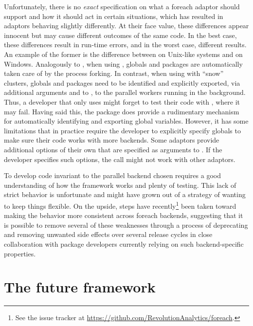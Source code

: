 Unfortunately, there is no \emph{exact} specification on what a
foreach adaptor should support and how it should act in certain
situations, which has resulted in adaptors behaving slightly
differently. At their face value, these differences appear innocent
but may cause different outcomes of the same code. In the best case,
these differences result in run-time errors, and in the worst case,
different results. An example of the former is the difference
between  on Unix-like systems and  on
Windows. Analogously to , when using ,
globals and packages are automatically taken care of by the process
forking. In contrast, when using  with ``snow''
clusters, globals and packages need to be identified and explicitly
exported, via additional arguments  and 
to , to the parallel workers running in the
background.  Thus, a developer that only uses  might forget
to test their code with , where it may fail.  Having
said this, the  package does provide a rudimentary
mechanism for automatically identifying and exporting global
variables.  However, it has some limitations that in practice require
the developer to explicitly specify globals to make sure their code
works with more backends.  Some adaptors provide additional options of
their own that are specified as arguments to . If the
developer specifies such options, the  call might not
work with other adaptors.

To develop  code invariant to the parallel backend
chosen requires a good understanding of how the 
framework works and plenty of testing. This lack of strict behavior is
unfortunate and might have grown out of a strategy of wanting to keep
things flexible. On the upside, steps have recently\footnote{See
the  issue tracker
at \url{https://github.com/RevolutionAnalytics/foreach}.}  been taken
toward making the behavior more consistent across foreach backends,
suggesting that it is possible to remove several of these weaknesses
through a process of deprecating and removing unwanted side effects
over several release cycles in close collaboration with package
developers currently relying on such backend-specific properties.

\vspace{-1ex} %
\section{The future framework}

